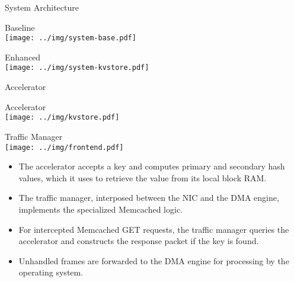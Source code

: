 \begin{block}{System Architecture}
\begin{multicols}{2}
\centering
\alert{Baseline} \\[0.5\baselineskip]
\texttt{[image: ../img/system-base.pdf]}

\columnbreak

\centering
\alert{Enhanced} \\[0.5\baselineskip]
\texttt{[image: ../img/system-kvstore.pdf]}
\end{multicols}
\end{block}

\vspace{1ex}

\begin{block}{Accelerator}
\footnotesize

\begin{multicols}{2}
\begin{center}
    \alert{Accelerator} \\[0.5\baselineskip]
    \texttt{[image: ../img/kvstore.pdf]}
\end{center}

\columnbreak

\begin{center}
    \alert{Traffic Manager} \\[0.5\baselineskip]
    \texttt{[image: ../img/frontend.pdf]}
\end{center}

\end{multicols}

\begin{itemize}
    \item The accelerator accepts a key and computes primary and secondary
        hash values, which it uses to retrieve the value from its local
        block RAM.
    \item The traffic manager, interposed between the NIC and the DMA
        engine, implements the specialized Memcached logic.
    \item For intercepted Memcached GET requests, the traffic manager queries the
	accelerator and constructs the response packet if the key is found.
    \item Unhandled frames are forwarded to the DMA engine for processing
	by the operating system.
\end{itemize}
\end{block}

\vspace{1ex}

